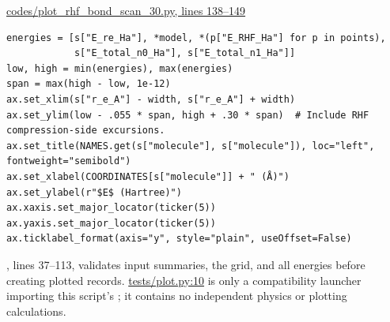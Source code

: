 \documentclass[10pt,a4paper]{article}
\begin{document}
\href{/Users/novaz/Desktop/qml2.0/codes/plot\_rhf\_bond\_scan\_30.py:138}{codes/plot\_rhf\_bond\_scan\_30.py, lines 138–149}

\begin{Verbatim}
energies = [s["E_re_Ha"], *model, *(p["E_RHF_Ha"] for p in points),
            s["E_total_n0_Ha"], s["E_total_n1_Ha"]]
low, high = min(energies), max(energies)
span = max(high - low, 1e-12)
ax.set_xlim(s["r_e_A"] - width, s["r_e_A"] + width)
ax.set_ylim(low - .055 * span, high + .30 * span)  # Include RHF compression-side excursions.
ax.set_title(NAMES.get(s["molecule"], s["molecule"]), loc="left", fontweight="semibold")
ax.set_xlabel(COORDINATES[s["molecule"]] + " (Å)")
ax.set_ylabel(r"$E$ (Hartree)")
ax.xaxis.set_major_locator(ticker(5))
ax.yaxis.set_major_locator(ticker(5))
ax.ticklabel_format(axis="y", style="plain", useOffset=False)
\end{Verbatim}
, lines 37–113, validates input summaries, the grid, and all energies before creating plotted records. \href{/Users/novaz/Desktop/qml2.0/tests/plot.py:10}{tests/plot.py:10} is only a compatibility launcher importing this script's ; it contains no independent physics or plotting calculations.
\end{document}
